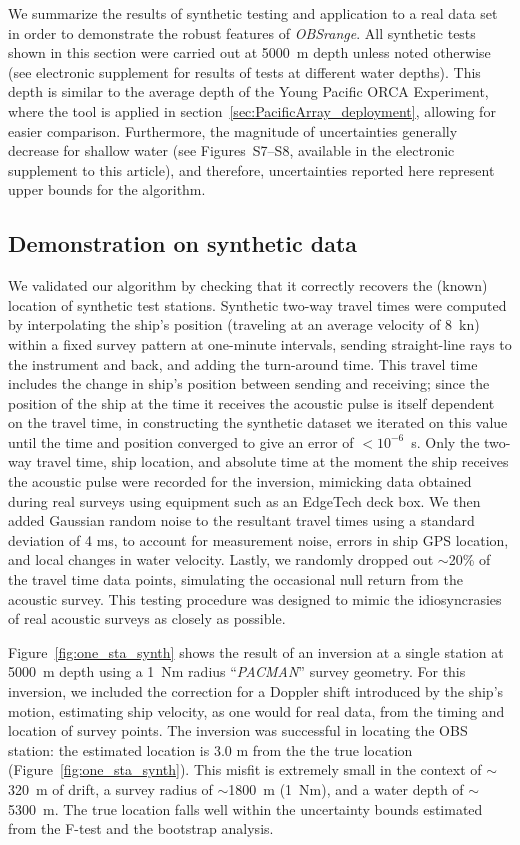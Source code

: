 We summarize the results of synthetic testing and application to a real data set in order to demonstrate the robust features of \textit{OBSrange}. All synthetic tests shown in this section were carried out at 5000~m depth unless noted otherwise (see electronic supplement for results of tests at different water depths). This depth is similar to the average depth of the Young Pacific ORCA Experiment, where the tool is applied in section~\ref{sec:PacificArray_deployment}, allowing for easier comparison. Furthermore, the magnitude of uncertainties generally decrease for shallow water (see Figures~S7--S8, available in the electronic supplement to this article), and therefore, uncertainties reported here represent upper bounds for the algorithm.

\subsection{Demonstration on synthetic data} \label{Demonstration on synthetic data}
We validated our algorithm by checking that it correctly recovers the (known) location of synthetic test stations. Synthetic two-way travel times were computed by interpolating the ship's position (traveling at an average velocity of 8~kn) within a fixed survey pattern at one-minute intervals, sending straight-line rays to the instrument and back, and adding the turn-around time. This travel time includes the change in ship's position between sending and receiving; since the position of the ship at the time it receives the acoustic pulse is itself dependent on the travel time, in constructing the synthetic dataset we iterated on this value until the time and position converged to give an error of \mbox{$<10^{-6}$ s}. Only the two-way travel time, ship location, and absolute time at the moment the ship receives the acoustic pulse were recorded for the inversion, mimicking data obtained during real surveys using equipment such as an EdgeTech deck box. We then added Gaussian random noise to the resultant travel times using a standard deviation of 4 ms, to account for measurement noise, errors in ship GPS location, and local changes in water velocity. Lastly, we randomly dropped out $\sim$20\% of the travel time data points, simulating the occasional null return from the acoustic survey. This testing procedure was designed to mimic the idiosyncrasies of real acoustic surveys as closely as possible. 

Figure~\ref{fig:one_sta_synth} shows the result of an inversion at a single station at 5000~m depth using a 1~Nm radius ``\textit{PACMAN}'' survey geometry. For this inversion, we included the correction for a Doppler shift introduced by the ship's motion, estimating ship velocity, as one would for real data, from the timing and location of survey points. The inversion was successful in locating the OBS station: the estimated location is 3.0 m from the the true location (Figure~\ref{fig:one_sta_synth}). This misfit is extremely small in the context of $\sim$320~m of drift, a survey radius of $\sim$1800~m (1~Nm), and a water depth of $\sim$5300~m. The true location falls well within the uncertainty bounds estimated from the F-test and the bootstrap analysis. 

